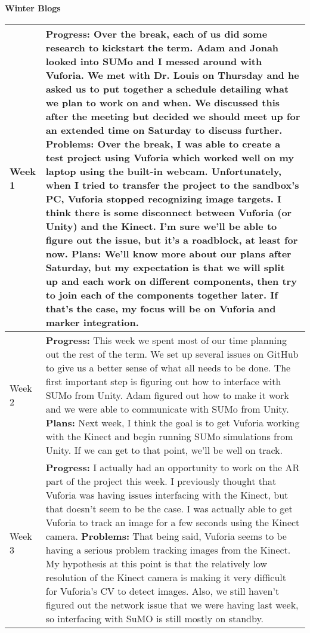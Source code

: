 \documentclass[letterpaper, 10pt, onecolumn, draftclsnofoot]{IEEEtran}
\begin{document}
        \begin{center}
        \large{\textbf{Winter Blogs}} \\
        \begin{longtable}{|p{4cm}|p{10cm}|}
            \hline
            Week 1 & \textbf{Progress:} Over the break, each of us did some research to kickstart the term. Adam and Jonah looked into SUMo and I messed around with Vuforia. We met with Dr. Louis on Thursday and he asked us to put together a schedule detailing what we plan to work on and when. We discussed this after the meeting but decided we should meet up for an extended time on Saturday to discuss further.
            \textbf{Problems:} Over the break, I was able to create a test project using Vuforia which worked well on my laptop using the built-in webcam. Unfortunately, when I tried to transfer the project to the sandbox's PC, Vuforia stopped recognizing image targets. I think there is some disconnect between Vuforia (or Unity) and the Kinect. I'm sure we'll be able to figure out the issue, but it's a roadblock, at least for now.
            \textbf{Plans:} We'll know more about our plans after Saturday, but my expectation is that we will split up and each work on different components, then try to join each of the components together later. If that's the case, my focus will be on Vuforia and marker integration.\\
            \hline
            Week 2 & \textbf{Progress:} This week we spent most of our time planning out the rest of the term. We set up several issues on GitHub to give us a better sense of what all needs to be done. The first important step is figuring out how to interface with SUMo from Unity. Adam figured out how to make it work and we were able to communicate with SUMo from Unity.
            \textbf{Plans:} Next week, I think the goal is to get Vuforia working with the Kinect and begin running SUMo simulations from Unity. If we can get to that point, we'll be well on track.\\
            \hline
            Week 3 & \textbf{Progress:} I actually had an opportunity to work on the AR part of the project this week. I previously thought that Vuforia was having issues interfacing with the Kinect, but that doesn't seem to be the case. I was actually able to get Vuforia to track an image for a few seconds using the Kinect camera.
            \textbf{Problems:} That being said, Vuforia seems to be having a serious problem tracking images from the Kinect. My hypothesis at this point is that the relatively low resolution of the Kinect camera is making it very difficult for Vuforia's CV to detect images. Also, we still haven't figured out the network issue that we were having last week, so interfacing with SuMO is still mostly on standby.

\end{longtable}
\end{center}
\end{document}
